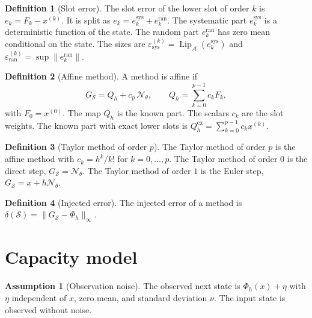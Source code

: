 \documentclass[11pt]{article}
\theoremstyle{definition}
\newtheorem{definition}{Definition}
\newtheorem{assumption}{Assumption}
\theoremstyle{remark}
\newcommand{\Aset}{\mathcal{A}}          %
\newcommand{\Net}{\mathcal{N}_\theta}    %
\newcommand{\Meth}{\mathcal{S}}          %
\newcommand{\Lip}{\operatorname{Lip}_{\Aset}}
\newcommand{\supA}[1]{\|#1\|_{\infty}}
\newcommand{\sys}{\mathrm{sys}}
\newcommand{\ran}{\mathrm{ran}}
\newcommand{\ex}{\mathrm{ex}}
\begin{document}
\begin{definition}[Slot error]\label{def:sloterror}
The slot error of the lower slot of order $k$ is $e_k = F_k - x^{(k)}$.
It is split as $e_k = e_k^\sys + e_k^\ran$.
The systematic part $e_k^\sys$ is a deterministic function of the state.
The random part $e_k^\ran$ has zero mean conditional on the state.
The sizes are $\varepsilon^{(k)}_\sys = \Lip(e_k^\sys)$ and $\varepsilon^{(k)}_\ran = \sup\|e_k^\ran\|$.
\end{definition}

\begin{definition}[Affine method]\label{def:affine}
A method is affine if
\begin{equation}\label{eq:affine}
G_\Meth = Q_h + c_p\,\Net, \qquad Q_h = \sum_{k=0}^{p-1} c_k F_k,
\end{equation}
with $F_0 = x^{(0)}$.
The map $Q_h$ is the known part.
The scalars $c_k$ are the slot weights.
The known part with exact lower slots is $Q_h^\ex = \sum_{k=0}^{p-1} c_k x^{(k)}$.
\end{definition}

\begin{definition}[Taylor method of order $p$]\label{def:taylor}
The Taylor method of order $p$ is the affine method with $c_k = h^k/k!$ for $k = 0,\dots,p$.
The Taylor method of order $0$ is the direct step, $G_\Meth = \Net$.
The Taylor method of order $1$ is the Euler step, $G_\Meth = x + h\Net$.
\end{definition}

\begin{definition}[Injected error]\label{def:injected}
The injected error of a method is $\delta(\Meth) = \supA{G_\Meth - \Phi_h}$.
\end{definition}

\section{Capacity model}\label{sec:capacity}

\begin{assumption}[Observation noise]\label{ass:noise}
The observed next state is $\Phi_h(x) + \eta$ with $\eta$ independent of $x$, zero mean, and standard deviation $\nu$.
The input state is observed without noise.
\end{assumption}
\end{document}

